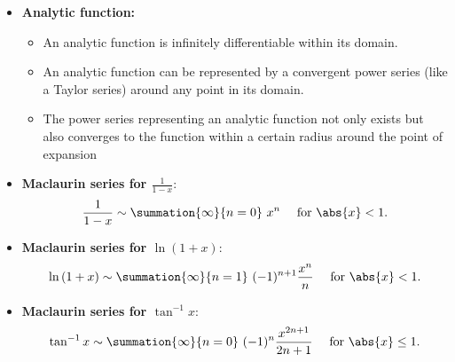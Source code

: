 \documentclass{report}
\begin{document}
\begin{itemize}
            \item \textbf{Analytic function:} 
                \begin{itemize}
                    \item An analytic function is infinitely differentiable within its domain.
                    \item An analytic function can be represented by a convergent power series (like a Taylor series) around any point in its domain. 
                    \item  The power series representing an analytic function not only exists but also converges to the function within a certain radius around the point of expansion
                \end{itemize}
            \item \textbf{Maclaurin series for $\frac{1}{1-x}$}:
                \begin{align*}
                    \frac{1}{1-x} \sim \summation{\infty}{n=0}\ x^{n} \ \quad \text{for } \abs{x} < 1
                .\end{align*}
            \item \textbf{Maclaurin series for $\ln{(1+x)}$}:
                \begin{align*}
                    \ln{(1+x)} \sim \summation{\infty}{n=1}\ (-1)^{n+1}\frac{x^{n}}{n} \ \quad \text{for }\abs{x} < 1
                .\end{align*}
            \item \textbf{Maclaurin series for $\tan^{-1}{x}$}:
                \begin{align*}
                    \tan^{-1}{x} \sim \summation{\infty}{n=0}\ (-1)^{n}\frac{x^{2n+1}}{2n+1} \ \quad \text{for } \abs{x} \leq 1
                .\end{align*}


\end{itemize}
\end{document}

